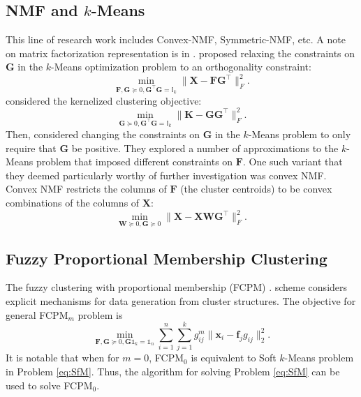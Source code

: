 \documentclass[journal]{IEEEtran}
\begin{document}
\subsection{NMF and $k$-Means}
This line of research work includes Convex-NMF, Symmetric-NMF, etc.
A note on matrix factorization representation is in \cite{bauckhage2015k}.
\cite{zha2002spectral} proposed  relaxing the constraints on $\mathbf{G}$ in the $k$-Means optimization problem to an orthogonality constraint:
\[
\min_{\mathbf{F},\mathbf{G}\succeq 0,\mathbf{G}^\top\mathbf{G} = \mathbb{I}_{k}} \| \mathbf{X} - \mathbf{FG}^\top\|_F^2.
\]
\cite{ding2005equivalence} considered the kernelized clustering objective:
\[
\min_{\mathbf{G}\succeq 0,\mathbf{G}^\top\mathbf{G} = \mathbb{I}_{k}} \| \mathbf{K} - \mathbf{GG}^\top\|_F^2.
\]
Then, \cite{ding2010convex} considered changing the constraints on $\mathbf{G}$ in the $k$-Means problem to only require that $\mathbf{G}$ be positive. They explored a number of approximations to the $k$-Means problem that imposed different constraints on $\mathbf{F}$. One such variant that they deemed particularly worthy of further investigation was convex NMF. Convex NMF restricts the columns of $\mathbf{F}$ (the cluster centroids) to be convex combinations of the columns of $\mathbf{X}$:
\[
\min_{\mathbf{
		W}\succeq 0, \mathbf{G} \succeq 0} \| \mathbf{X} - \mathbf{XWG}^\top\|_F^2.
\]
\subsection{Fuzzy Proportional Membership Clustering}
The fuzzy clustering with proportional membership (FCPM) \cite{nascimento2000fuzzy,nascimento2003modeling,nascimento2016applying}. scheme considers explicit mechanisms for data generation from cluster structures.
The objective for general FCPM$_m$ problem is
\[
\min_{\mathbf{F}, \mathbf{G}\succeq 0,\mathbf{G}\mathbb{1}_k = \mathbb{1}_n} 
\sum_{i=1}^n\sum_{j=1}^k g_{ij}^m \| \mathbf{x}_i - \mathbf{f}_j g_{ij} \|_2^2.
\]
It is notable that when for $m=0$, FCPM$_0$ is equivalent to Soft $k$-Means problem in Problem \eqref{eq:SfM}.
Thus, the algorithm for solving Problem \eqref{eq:SfM} can be used to solve FCPM$_0$.
\end{document}
